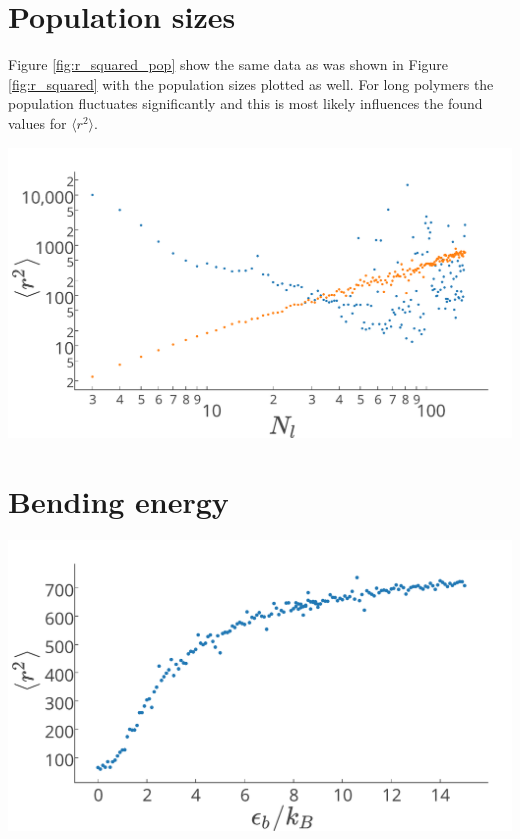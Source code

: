 \section{Population sizes}

Figure \ref{fig:r_squared_pop} show the same data as was shown in Figure \ref{fig:r_squared} with the population sizes plotted as well. For long polymers the population fluctuates significantly and this is most likely influences the found values for $\langle r^2 \rangle$.
\begin{Figure}
  \centerfloat
     \includegraphics[width=\linewidth]{r_squared_pop.pdf}
 \label{fig:r_squared_pop}
\end{Figure}

\section{Bending energy}

\begin{Figure}
  \centerfloat
     \includegraphics[width=\linewidth]{r_squared_bending.pdf}
 \label{fig:r_squared_bending}
\end{Figure}